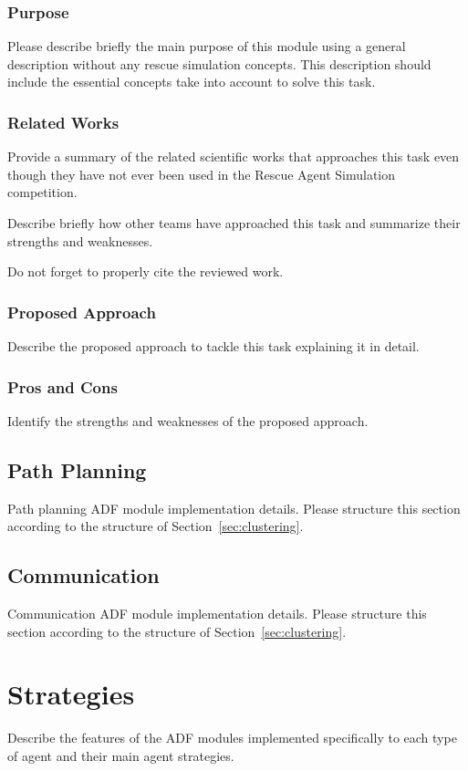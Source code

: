 \documentclass[runningheads,a4paper]{llncs}
\begin{document}
\subsubsection{Purpose}
\label{sec:clustering:purpose}
Please describe briefly the main purpose of this module using a general description without any rescue simulation concepts. This description should include the essential concepts take into account to solve this task.
\subsubsection{Related Works}
\label{sec:clustering:related}
Provide a summary of the related scientific works that approaches this task even though they have not ever been used in the Rescue Agent Simulation competition.

Describe briefly how other teams have approached this task and summarize their strengths and weaknesses.

Do not forget to properly cite the reviewed work.
\subsubsection{Proposed Approach}
\label{sec:clustering:proposed}
Describe the proposed approach to tackle this task explaining it in detail.
\subsubsection{Pros and Cons}
\label{sec:clustering:pros-cons}
Identify the strengths and weaknesses of the proposed approach.
\subsection{Path Planning}
\label{sec:path}
Path planning ADF module implementation details. Please structure this section according to the structure of Section~\ref{sec:clustering}.
\subsection{Communication}
\label{sec:comm}
Communication ADF module implementation details. Please structure this section according to the structure of Section~\ref{sec:clustering}.
\section{Strategies}
\label{sec:strategies}
Describe the features of the ADF modules implemented specifically to each type of agent and their main agent strategies.
\end{document}
